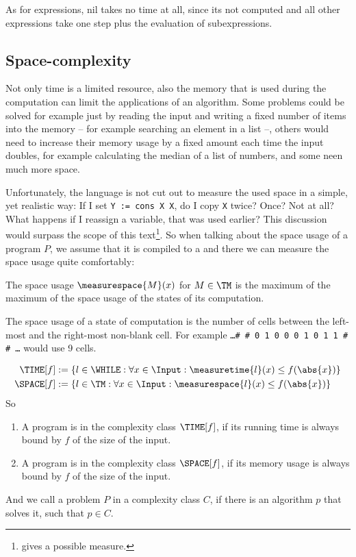 As for expressions, nil takes no time at all, since its not computed and all
other expressions take one step plus the evaluation of subexpressions.

\subsection{Space-complexity}
Not only time is a limited resource, also the memory that is used during the 
computation can limit the applications of an algorithm. Some problems could 
be solved for example just by reading the input and writing a fixed number of 
items into the memory -- for example searching an element in a list --, others
would need to increase their memory usage by a fixed amount each time the 
input doubles, for example calculating the median of a list of numbers, and 
some neen much more space.

Unfortunately, the \WHILE language is not cut out to measure the used space 
in a simple, yet realistic way: If I set {\tt Y := cons X X}, do I copy {\tt X}
twice? Once?  Not at all? What happens if I reassign a variable, that was used
earlier?  This discussion would surpass the scope of this
text\footnote{\cite[p. 325f]{jones} gives a possible measure.}. So when 
talking about the space usage of a program $P$, we assume that it is compiled 
to a \TM and there we can measure the space usage quite comfortably:

The space usage $\measurespace{M}(x)$ for $M\in \TM$ is the maximum of the 
maximum of the space usage of the states of its computation.

The space usage of a state of computation is the number of cells between the 
left-most and the right-most non-blank cell. For example {\tt \dots \# \# 0 1 
0 0 0 1 0 1 1 \# \# \dots} would use 9 cells.

\begin{defn}
	\begin{equation*}
		\begin{split}
			\TIME[f]  &:= \{l\in \WHILE : \forall x\in \Input:  \measuretime{l}(x) \leq f(\abs{x})\} \\
			\SPACE[f] &:= \{l\in \TM : \forall x\in \Input: \measurespace{l}(x) \leq f(\abs{x})\}
		\end{split}
	\end{equation*}
	So
	\begin{enumerate}
		\item A program is in the complexity class $\TIME[f]$, if its running time is always bound 
			by $f$ of the size of the input.
		\item A program is in the complexity class $\SPACE[f]$, if its memory usage is always bound 
			by $f$ of the size of the input.
	\end{enumerate}
	And we call a problem $P$ in a complexity class $C$, if there is an 
	algorithm $p$ that solves it, such that $p\in C$.
\end{defn}

